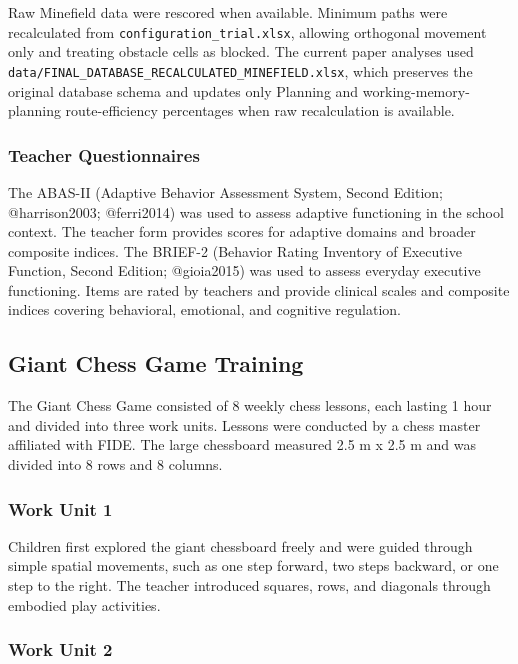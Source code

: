 \documentclass[
  letterpaper,
  DIV=11,
  numbers=noendperiod]{scrartcl}
\begin{document}
Raw Minefield data were rescored when available. Minimum paths were
recalculated from \texttt{configuration\_trial.xlsx}, allowing
orthogonal movement only and treating obstacle cells as blocked. The
current paper analyses used
\texttt{data/FINAL\_DATABASE\_RECALCULATED\_MINEFIELD.xlsx}, which
preserves the original database schema and updates only Planning and
working-memory-planning route-efficiency percentages when raw
recalculation is available.

\subsubsection{Teacher Questionnaires}\label{teacher-questionnaires}

The ABAS-II (Adaptive Behavior Assessment System, Second Edition;
@harrison2003; @ferri2014) was used to assess adaptive functioning in
the school context. The teacher form provides scores for adaptive
domains and broader composite indices. The BRIEF-2 (Behavior Rating
Inventory of Executive Function, Second Edition; @gioia2015) was used to
assess everyday executive functioning. Items are rated by teachers and
provide clinical scales and composite indices covering behavioral,
emotional, and cognitive regulation.

\subsection{Giant Chess Game Training}\label{giant-chess-game-training}

The Giant Chess Game consisted of 8 weekly chess lessons, each lasting 1
hour and divided into three work units. Lessons were conducted by a
chess master affiliated with FIDE. The large chessboard measured 2.5 m x
2.5 m and was divided into 8 rows and 8 columns.

\subsubsection{Work Unit 1}\label{work-unit-1}

Children first explored the giant chessboard freely and were guided
through simple spatial movements, such as one step forward, two steps
backward, or one step to the right. The teacher introduced squares,
rows, and diagonals through embodied play activities.

\subsubsection{Work Unit 2}\label{work-unit-2}
\end{document}
